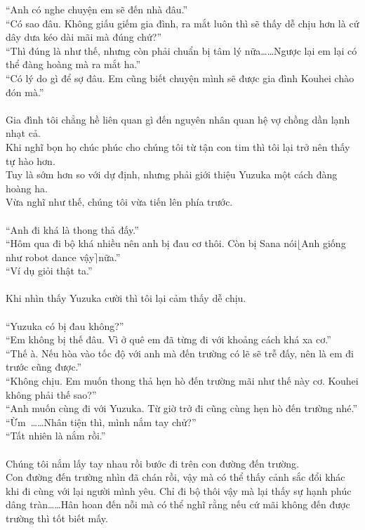 \documentclass[12pt,a4paper, twosides]{book}
\begin{document}
“Anh có nghe chuyện em sẽ đến nhà đâu.”\\
“Có sao đâu. Không giấu giếm gia đình, ra mắt luôn thì sẽ thấy dễ chịu hơn là cứ dây dưa kéo dài mãi mà đúng chứ?”\\
“Thì đúng là như thế, nhưng còn phải chuẩn bị tâm lý nữa……Ngược lại em lại có thể đàng hoàng mà ra mắt ha.”\\
“Có lý do gì để sợ đâu. Em cũng biết chuyện mình sẽ được gia đình Kouhei chào đón mà.”\\
\\
Gia đình tôi chẳng hề liên quan gì đến nguyên nhân quan hệ vợ chồng dần lạnh nhạt cả.\\
Khi nghĩ bọn họ chúc phúc cho chúng tôi từ tận con tim thì tôi lại trở nên thấy tự hào hơn.\\
Tuy là sớm hơn so với dự định, nhưng phải giới thiệu Yuzuka một cách đàng hoàng ha.\\
Vừa nghĩ như thế, chúng tôi vừa tiến lên phía trước.\\
\\
“Anh đi khá là thong thả đấy.”\\
“Hôm qua đi bộ khá nhiều nên anh bị đau cơ thôi. Còn bị Sana nói$\lfloor$Anh giống như robot dance vậy$\rceil$nữa.”\\
“Ví dụ giỏi thật ta.”\\
\\
Khi nhìn thấy Yuzuka cười thì tôi lại cảm thấy dễ chịu.\\
\\
“Yuzuka có bị đau không?”\\
“Em không bị thế đâu. Vì ở quê em đã từng đi với khoảng cách khá xa cơ.”\\
“Thế à. Nếu hòa vào tốc độ với anh mà đến trường có lẽ sẽ trễ đấy, nên là em đi trước cũng được.”\\
“Không chịu. Em muốn thong thả hẹn hò đến trường mãi như thế này cơ. Kouhei không phải thế sao?”\\
“Anh muốn cùng đi với Yuzuka. Từ giờ trở đi cũng cùng hẹn hò đến trường nhé.”\\
“Ừm~……Nhân tiện thì, mình nắm tay chử?”\\
“Tất nhiên là nắm rồi.”\\
\\
Chúng tôi nắm lấy tay nhau rồi bước đi trên con đường đến trường.\\
Con đường đến trường nhìn đã chán rồi, vậy mà có thể thấy cảnh sắc đổi khác khi đi cùng với lại người mình yêu. Chỉ đi bộ thôi vậy mà lại thấy sự hạnh phúc dâng tràn……Hân hoan đến nỗi mà có thể nghĩ rằng nếu cứ mãi không đến được trường thì tốt biết mấy.\\
\end{document}
